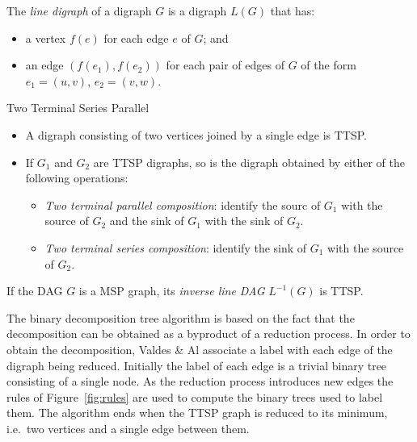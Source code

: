 \begin{mydef}
The \emph{line digraph} of a digraph $G$ is a digraph $L(G)$ that has:
\begin{itemize}
\item a vertex $f(e)$ for each edge $e$ of $G$; and
\item an edge $(f(e_1),f(e_2))$ for each pair of edges of $G$ of the form $e_1=(u,v)$, $e_2=(v,w)$.
\end{itemize}
\end{mydef}

\begin{mydef}Two Terminal Series Parallel
\begin{itemize}
\item A digraph consisting of two vertices joined by a single edge is TTSP.
\item If $G_1$ and $G_2$ are TTSP digraphs, so is the digraph obtained by either of the following operations:
\begin{itemize}
\item \emph{Two terminal parallel composition}: identify the sourc of $G_1$ with the source of $G_2$ and the sink of $G_1$ with the sink of $G_2$.
\item \emph{Two terminal series composition}: identify the sink of $G_1$ with the source of $G_2$.
\end{itemize}
\end{itemize}
\end{mydef}

\begin{myth}
If the DAG $G$ is a MSP graph, its \emph{inverse line DAG} $L^{-1}(G)$ is TTSP.
\end{myth}

The binary decomposition tree algorithm is based on the fact that the decomposition can be obtained as a byproduct of a reduction process. In order to obtain the decomposition, Valdes \& Al associate a label with each edge of the digraph being reduced. Initially the label of each edge is a trivial binary tree consisting of a single node. As the reduction process introduces new edges the rules of Figure~\ref{fig:rules} are used to compute the binary trees used to label them. The algorithm ends when the TTSP graph is reduced to its minimum, i.e.\ two vertices and a single edge between them.

